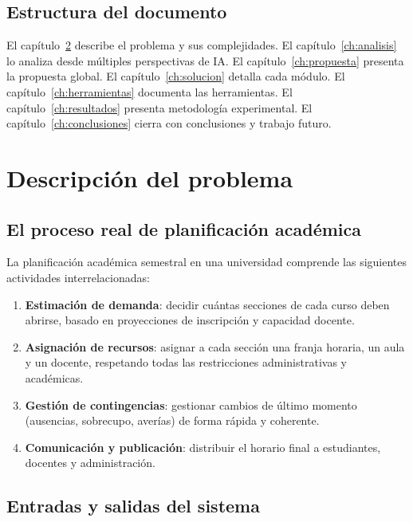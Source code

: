 \documentclass[12pt,twoside]{report}
\theoremstyle{definition}
\begin{document}
\section{Estructura del documento}

El cap\'itulo~\ref{ch:problema} describe el problema y sus complejidades.
El cap\'itulo~\ref{ch:analisis} lo analiza desde m\'ultiples perspectivas de IA.
El cap\'itulo~\ref{ch:propuesta} presenta la propuesta global.
El cap\'itulo~\ref{ch:solucion} detalla cada m\'odulo.
El cap\'itulo~\ref{ch:herramientas} documenta las herramientas.
El cap\'itulo~\ref{ch:resultados} presenta metodolog\'ia experimental.
El cap\'itulo~\ref{ch:conclusiones} cierra con conclusiones y trabajo futuro.

\chapter{Descripción del problema}
\label{ch:problema}

\section{El proceso real de planificaci\'on acad\'emica}

La planificaci\'on acad\'emica semestral en una universidad comprende las siguientes
actividades interrelacionadas:

\begin{enumerate}[leftmargin=2em,itemsep=4pt]
  \item \textbf{Estimaci\'on de demanda}: decidir cu\'antas secciones de cada curso
    deben abrirse, basado en proyecciones de inscripci\'on y capacidad docente.
  \item \textbf{Asignaci\'on de recursos}: asignar a cada secci\'on una franja
    horaria, un aula y un docente, respetando todas las restricciones administrativas
    y acad\'emicas.
  \item \textbf{Gesti\'on de contingencias}: gestionar cambios de \'ultimo momento
    (ausencias, sobrecupo, aver\'ias) de forma r\'apida y coherente.
  \item \textbf{Comunicaci\'on y publicaci\'on}: distribuir el horario final a
    estudiantes, docentes y administraci\'on.
\end{enumerate}

\section{Entradas y salidas del sistema}
\end{document}
